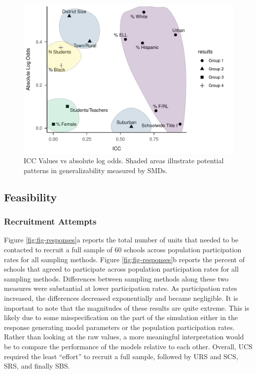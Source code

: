 \documentclass[man,floatsintext]{apa6}
\begin{document}
\begin{figure}
\centering
\includegraphics{GenSamp-Paper_files/figure-latex/fig-ICCvsCoef-1.pdf}
\caption{\label{fig:fig-ICCvsCoef}ICC Values vs absolute log odds. Shaded areas illustrate potential patterns in generalizability measured by SMDs.}
\end{figure}

\hypertarget{feasibility-1}{%
\subsection{Feasibility}\label{feasibility-1}}

\hypertarget{recruitment-attempts}{%
\subsubsection{Recruitment Attempts}\label{recruitment-attempts}}

Figure \ref{fig:fig-responses}a reports the total number of units that needed to be contacted to recruit a full sample of 60 schools across population participation rates for all sampling methods. Figure \ref{fig:fig-responses}b reports the percent of schools that agreed to participate across population participation rates for all sampling methods. Differences between sampling methods along these two measures were substantial at lower participation rates. As participation rates increased, the differences decreased exponentially and became negligible. It is important to note that the magnitudes of these results are quite extreme. This is likely due to some misspecification on the part of the simulation either in the response generating model parameters or the population participation rates. Rather than looking at the raw values, a more meaningful interpretation would be to compare the performance of the models relative to each other. Overall, UCS required the least \enquote{effort} to recruit a full sample, followed by URS and SCS, SRS, and finally SBS.
\end{document}
